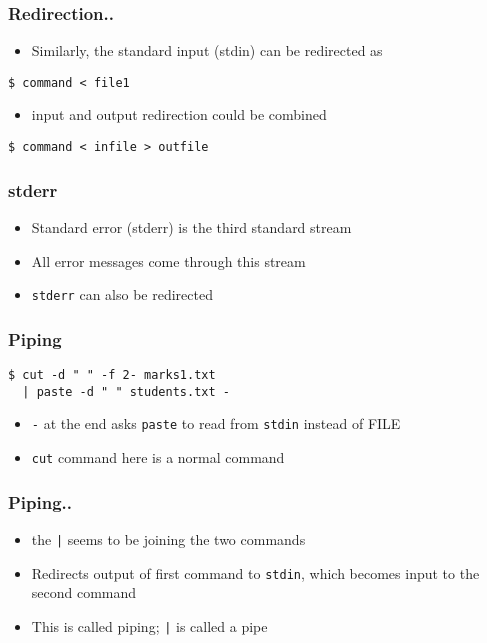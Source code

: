 \documentclass[17pt,compress]{beamer}
\begin{document}
\begin{frame}[fragile]
  \frametitle{Redirection..} 
  \begin{itemize}
  \item Similarly, the standard input (stdin) can be redirected as
  \end{itemize}
  \hspace{29pt}\texttt{\$ command < file1}
  \begin{itemize}
  \item input and output redirection could be combined
  \end{itemize}
  \hspace{29pt}\texttt{\$ command < infile > outfile}
\end{frame}

\begin{frame}
\frametitle{stderr}
  \begin{itemize}
  \item Standard error (stderr) is the third standard stream
  \item All error messages come through this stream
  \item \texttt{stderr} can also be redirected
  \end{itemize}
\end{frame}

\begin{frame}[fragile]
\frametitle{Piping}
\begin{lstlisting}
$ cut -d " " -f 2- marks1.txt 
  | paste -d " " students.txt -
  \end{lstlisting} %
  \begin{itemize}
  \item \texttt{-} at the end asks \texttt{paste} to read from
    \texttt{stdin} instead of FILE 
  \item \texttt{cut} command here is a normal command
  \end{itemize}
\end{frame}

\begin{frame}[fragile]
\frametitle{Piping..}
\begin{itemize}
  \item the \texttt{|} seems to be joining the two commands
  \item Redirects output of first command to \texttt{stdin}, which
    becomes input to the second command
  \item This is called piping; \texttt{|} is called a pipe
  \end{itemize}
\end{frame}
\end{document}
